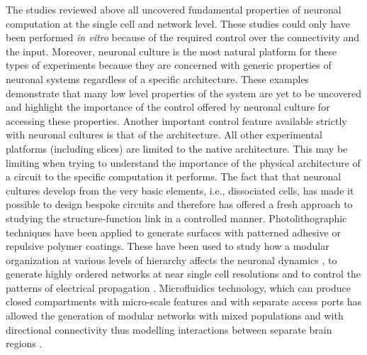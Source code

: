     The studies reviewed above all uncovered fundamental properties of neuronal computation at the single cell and network level. These studies could only have been performed \textit{in vitro} because of the required control over the connectivity and the input. Moreover, neuronal culture is the most natural platform for these types of experiments because they are concerned with generic properties of neuronal systems regardless of a specific architecture. These examples demonstrate that many low level properties of the system are yet to be uncovered and highlight the importance of the control offered by neuronal culture for accessing these properties. Another important control feature available strictly with neuronal cultures is that of the architecture. All other experimental platforms (including slices) are limited to the native architecture. This may be limiting when trying to understand the importance of the physical architecture of a circuit to the specific computation it performs. The fact that that neuronal cultures develop from the very basic elements, i.e., dissociated cells, has made it possible to design bespoke circuits and therefore has offered a fresh approach to studying the structure-function link in a controlled manner. Photolithographic techniques have been applied to generate surfaces with patterned adhesive or repulsive polymer coatings. These have been used to study how a modular organization at various levels of hierarchy affects the neuronal dynamics \cite{levy2012enhancement,shein2011engineered}, to generate highly ordered networks at near single cell resolutions \cite{kwiat2012highly,kang2010generation} and to control the patterns of electrical propagation \cite{feinerman2008reliable}. Microfluidics technology, which can produce closed compartments with micro-scale features and with separate access ports has allowed the generation of modular networks with mixed populations and with directional connectivity thus modelling interactions between separate brain regions \cite{robertson2014chemically,honegger2016microfluidic,peyrin2011axon,dauth2016neurons}.



